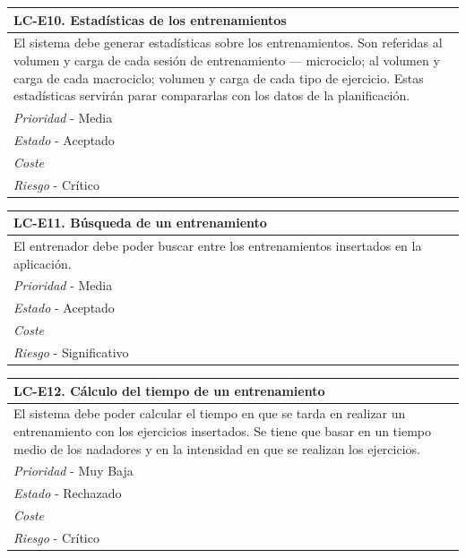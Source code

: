 	\begin{center}
		\begin{tabularx}{15cm}{|X|}
			\hline 
				\bf{LC-E10. Estadísticas de los entrenamientos}\\
			\hline
				El sistema debe generar estadísticas sobre los entrenamientos. Son referidas al volumen y carga de cada sesión de entrenamiento --- microciclo; al volumen y carga de cada macrociclo; volumen y carga de cada tipo de ejercicio. Estas estadísticas servirán parar compararlas con los datos de la planificación.\\
			\hline
				{\it Prioridad} - Media\\
			\hline
				{\it Estado} - Aceptado\\
			\hline
				{\it Coste}\\
			\hline
				{\it Riesgo} - Crítico\\
			\hline
		\end{tabularx}
	\end{center}
	
	\begin{center}
		\begin{tabularx}{15cm}{|X|}
			\hline 
				\bf{LC-E11. Búsqueda de un entrenamiento}\\
			\hline
				El entrenador debe poder buscar entre los entrenamientos insertados en la aplicación.\\
			\hline
				{\it Prioridad} - Media\\
			\hline
				{\it Estado} - Aceptado\\
			\hline
				{\it Coste}\\
			\hline
				{\it Riesgo} - Significativo\\
			\hline
		\end{tabularx}
	\end{center}
	
	\begin{center}
		\begin{tabularx}{15cm}{|X|}
			\hline 
				\bf{LC-E12. Cálculo del tiempo de un entrenamiento}\\
			\hline
				El sistema debe poder calcular el tiempo en que se tarda en realizar un entrenamiento con los ejercicios insertados. Se tiene que basar en un tiempo medio de los nadadores y en la intensidad en que se realizan los ejercicios.\\
			\hline
				{\it Prioridad} - Muy Baja\\
			\hline
				{\it Estado} - Rechazado\\
			\hline
				{\it Coste}\\
			\hline
				{\it Riesgo} - Crítico\\
			\hline
		\end{tabularx}
	\end{center}

